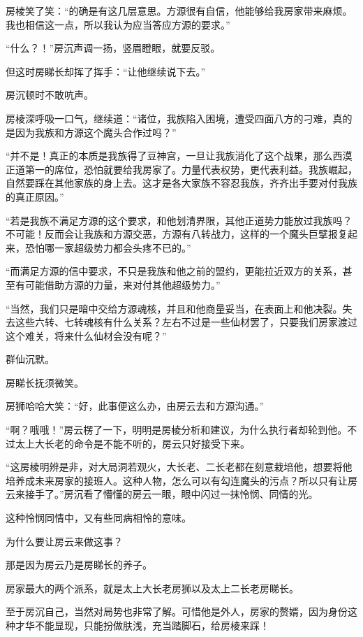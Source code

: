 \begin{this_body}
房棱笑了笑：“的确是有这几层意思。方源很有自信，他能够给我房家带来麻烦。我也相信这一点，所以我认为应当答应方源的要求。”

“什么？！”房沉声调一扬，竖眉瞪眼，就要反驳。

但这时房睇长却挥了挥手：“让他继续说下去。”

房沉顿时不敢吭声。

房棱深呼吸一口气，继续道：“诸位，我族陷入困境，遭受四面八方的刁难，真的是因为我族和方源这个魔头合作过吗？”

“并不是！真正的本质是我族得了豆神宫，一旦让我族消化了这个战果，那么西漠正道第一的席位，恐怕就要给我房家了。力量代表权势，更代表利益。我族崛起，自然要踩在其他家族的身上去。这才是各大家族不容忍我族，齐齐出手要对付我族的真正原因。”

“若是我族不满足方源的这个要求，和他划清界限，其他正道势力能放过我族吗？不可能！反而会让我族和方源交恶，方源有八转战力，这样的一个魔头巨擘报复起来，恐怕哪一家超级势力都会头疼不已的。”

“而满足方源的信中要求，不只是我族和他之前的盟约，更能拉近双方的关系，甚至有可能借助方源的力量，来对付其他超级势力。”

“当然，我们只是暗中交给方源魂核，并且和他商量妥当，在表面上和他决裂。失去这些六转、七转魂核有什么关系？左右不过是一些仙材罢了，只要我们房家渡过这个难关，将来什么仙材会没有呢？”

群仙沉默。

房睇长抚须微笑。

房狮哈哈大笑：“好，此事便这么办，由房云去和方源沟通。”

“啊？哦哦！”房云楞了一下，明明是房棱分析和建议，为什么执行者却轮到他。不过太上大长老的命令是不能不听的，房云只好接受下来。

“这房棱明辨是非，对大局洞若观火，大长老、二长老都在刻意栽培他，想要将他培养成未来房家的接班人。这种人物，怎么可以有勾连魔头的污点？所以只有让房云来接手了。”房沉看了懵懂的房云一眼，眼中闪过一抹怜悯、同情的光。

这种怜悯同情中，又有些同病相怜的意味。

为什么要让房云来做这事？

那是因为房云乃是房睇长的养子。

房家最大的两个派系，就是太上大长老房狮以及太上二长老房睇长。

至于房沉自己，当然对局势也非常了解。可惜他是外人，房家的赘婿，因为身份这种才华不能显现，只能扮做肤浅，充当踏脚石，给房棱来踩！

\end{this_body}

